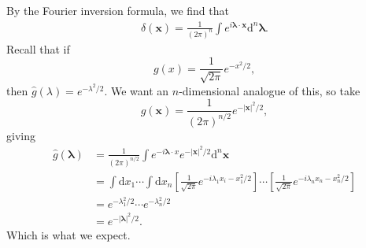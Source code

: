 \documentclass{article}
\begin{document}
By the Fourier inversion formula, we find that
\begin{align*}
	\delta(\mathbf x)=\frac 1{(2\pi)^n}\int e^{i\boldsymbol \lambda\cdot \mathbf x}\mathrm d^n\boldsymbol \lambda.
\end{align*}
Recall that if
\[
	g(x)=\frac 1{\sqrt{2\pi}}e^{-x^2/2},
\]
then $ \hat g(\lambda)=e^{-\lambda^2/2} $. We want an $ n $-dimensional analogue of this, so take
\[
	g(\mathbf x)=\frac 1{(2\pi)^{n/2}}e^{-|\mathbf x|^2/2},
\]
giving
\begin{align*}
	\hat g(\boldsymbol \lambda )&=\frac{1}{(2\pi)^{n/2}}\int e^{-i\boldsymbol \lambda \cdot x}e^{-|\mathbf x|^2/2}\mathrm d^n\mathbf x\\
				    &=\int\mathrm dx_1\cdots \int\mathrm dx_n\left[\frac{1}{\sqrt{2\pi}}e^{-i\lambda_1x_i-x_1^2/2}\right]\cdots \left[\frac1{\sqrt{2\pi}}e^{-i\lambda_nx_n-x_n^2/2}\right]\\
				    &=e^{-\lambda_1^2/2}\cdots e^{-\lambda_n^2/2}\\
				    &=e^{-|\boldsymbol \lambda|^2/2}.
\end{align*}
Which is what we expect.
\end{document}
